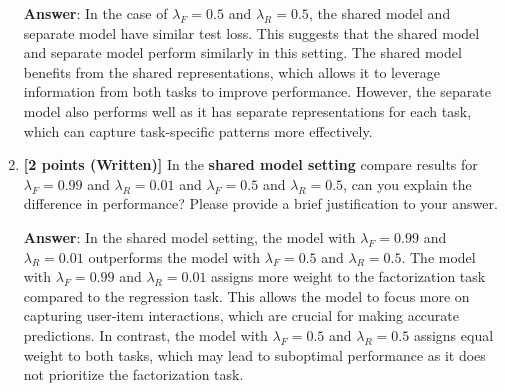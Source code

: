 \documentclass[12pt]{article}
\begin{document}
\begin{enumerate}
    \textbf{Answer}: In the case of $\lambda_F=0.5$ and $\lambda_R=0.5$, the shared model and separate model have similar test loss. This suggests that the shared model and separate model perform similarly in this setting. The shared model benefits from the shared representations, which allows it to leverage information from both tasks to improve performance. However, the separate model also performs well as it has separate representations for each task, which can capture task-specific patterns more effectively.
    \item \textbf{[2 points (Written)]} In the \textbf{shared model setting} compare results for $\lambda_F=0.99$ and $\lambda_R=0.01$ and $\lambda_F=0.5$ and $\lambda_R=0.5$, can you explain the difference in performance? Please provide a brief justification to your answer.
    
    \textbf{Answer}: In the shared model setting, the model with $\lambda_F=0.99$ and $\lambda_R=0.01$ outperforms the model with $\lambda_F=0.5$ and $\lambda_R=0.5$. The model with $\lambda_F=0.99$ and $\lambda_R=0.01$ assigns more weight to the factorization task compared to the regression task. This allows the model to focus more on capturing user-item interactions, which are crucial for making accurate predictions. In contrast, the model with $\lambda_F=0.5$ and $\lambda_R=0.5$ assigns equal weight to both tasks, which may lead to suboptimal performance as it does not prioritize the factorization task.
\end{enumerate}

\vspace{0.8cm}


\newpage


\end{document}
